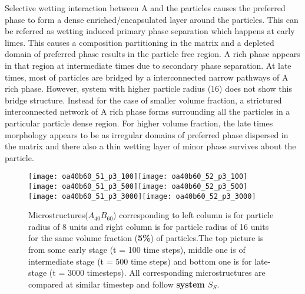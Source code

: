 \documentclass[12pt]{iiscthes}
\theoremstyle{definition}
\theoremstyle{definition}
\theoremstyle{remark}
\begin{document}
Selective wetting interaction between A and the particles causes the preferred phase to form a dense enriched/encapsulated layer around the particles. This can be referred as wetting induced primary phase separation which happens at early limes. This causes a composition partitioning in the matrix and a depleted domain of preferred phase results in the particle free region. A rich phase appears in that region at intermediate times due to secondary phase separation. At late times, most of particles are bridged by a interconnected narrow pathways of A rich phase. However, system with higher particle radius (16) does not show this bridge structure. Instead for the case of smaller volume fraction, a strictured interconnected network of A rich phase forms surrounding all the particles in a particular particle dense region.  For higher volume fraction, the late times morphology appears to be as irregular domains of preferred phase dispersed in the matrix and there also a thin wetting layer of minor phase survives about the particle. 
\newpage
\begin{figure}[H]
\begin{center}
\texttt{[image: oa40b60\_51\_p3\_100]}\texttt{[image: oa40b60\_52\_p3\_100]}\\
\texttt{[image: oa40b60\_51\_p3\_500]}\texttt{[image: oa40b60\_52\_p3\_500]}\\
\texttt{[image: oa40b60\_51\_p3\_3000]}\texttt{[image: oa40b60\_52\_p3\_3000]}\\
\caption{Microstructures($A_{40}B_{60}$) corresponding to left column is for particle radius of 8 units and right column is for particle radius of 16 units for the same volume fraction (\textbf{5\%}) of particles.The top picture is from some early stage (t = 100 time steps), middle one is of intermediate stage (t = 500 time steps) and bottom one is for late-stage (t = 3000 timesteps). All corresponding microstructures are compared at similar timestep and follow \textbf{system $S_S$}.}\label{o1512_p3}
\end{center}
\end{figure}
\end{document}
